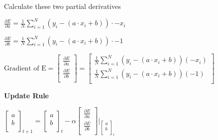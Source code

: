 Calculate these two partial derivatives

\begin{center}
    $\frac{\partial E}{\partial a} = \frac{1}{N}\sum_{i=1}^N (y_i - (a \cdot x_i + b)) \cdot -x_i$
\end{center}

\begin{center}
    $\frac{\partial E}{\partial b} = \frac{1}{N}\sum_{i=1}^N (y_i - (a \cdot x_i + b)) \cdot -1$
\end{center}

\begin{center}
    $
     \textrm{Gradient of E} = \begin{bmatrix}
                                  \frac{\partial E}{\partial a} \\
                                  \frac{\partial E}{\partial b} \\
     \end{bmatrix}
     =\begin{bmatrix}
          \frac{1}{N}\sum_{i=1}^N (y_i - (a \cdot x_i + b))(-x_i) \\
          \frac{1}{N}\sum_{i=1}^N (y_i - (a \cdot x_i + b))(-1) \\
     \end{bmatrix}
    $
\end{center}

\textbf{Update Rule}

\begin{center}
    $
    \begin{bmatrix}
        a \\
        b \\
    \end{bmatrix}_{t+1}
    =    \begin{bmatrix}
             a \\
             b \\
    \end{bmatrix}_{t} - \alpha
    \begin{bmatrix}
        \frac{\partial E}{\partial a} \\
        \frac{\partial E}{\partial b} \\
    \end{bmatrix} \Big\rvert _{\begin{bmatrix}
                                   a \\
                                   b \\
    \end{bmatrix}_{t} }
    $
\end{center}

